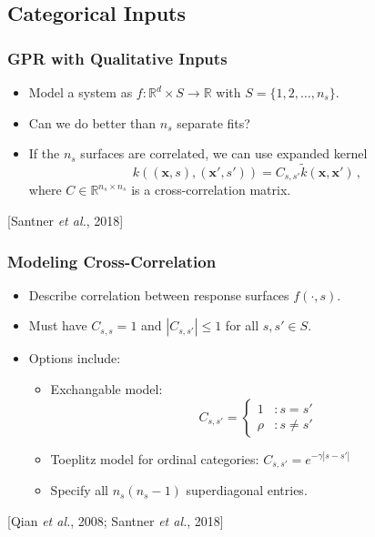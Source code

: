 \documentclass{beamer}
\newcommand{\R}{\mathbb{R}}
\newcommand{\vect}[1]{\boldsymbol{#1}}
\newcommand{\citeAY}[1]{
	\begin{flushright}
		{\footnotesize [#1]}
	\end{flushright}
}
\begin{document}
	\subsection{Categorical Inputs}
	\begin{frame}
		\frametitle{GPR with Qualitative Inputs}
		\begin{itemize}
			\item Model a system as $f:\R^d\times S\to\R$ with $S=\{1,2,\ldots,n_s\}$.
			\item Can we do better than $n_s$ separate fits?
			\item If the $n_s$ surfaces are correlated, we can use expanded kernel $$k\left((\vect{x},s),(\vect{x}',s')\right)=C_{s,s'}\tilde{k}(\vect{x},\vect{x}')\,,$$ where $C\in\R^{n_s\times n_s}$ is a cross-correlation matrix.
		\end{itemize}
		\citeAY{Santner \emph{et al.}, 2018}
	\end{frame}
	
	\begin{frame}
		\frametitle{Modeling Cross-Correlation}
		\begin{itemize}
			\item Describe correlation between response surfaces $f(\cdot,s)$.
			\item Must have $C_{s,s}=1$ and $|C_{s,s'}|\leq1$ for all $s,s'\in S$.
			\item Options include:
			\begin{itemize}
				\item Exchangable model:
				\begin{equation*}
					C_{s,s'}=\left\{
					\begin{array}{cl}
						1 & : s=s'\\
						\rho & : s\neq s'
					\end{array}\right.
				\end{equation*}
				\item Toeplitz model for ordinal categories: $C_{s,s'}=e^{-\gamma|s-s'|}$ %
				\item Specify all $n_s(n_s-1)$ superdiagonal entries.
			\end{itemize}
		\end{itemize}
		\citeAY{Qian \emph{et al.}, 2008; Santner \emph{et al.}, 2018}
	\end{frame}
	
\end{document}
